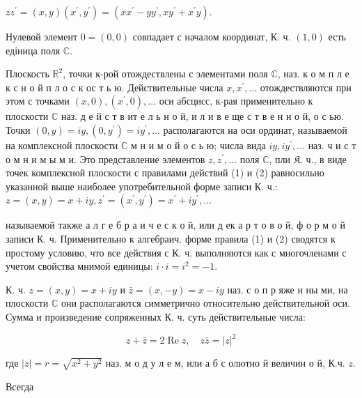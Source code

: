 \documentclass[10pt]{article}
\begin{document}
$z z^{\prime}=(x, y)\left(x^{\prime}, y^{\prime}\right)=\left(x x^{\prime}-y y^{\prime}, x y^{\prime}+x^{\prime} y\right)$.



Нулевой элемент $0=(0,0)$ совпадает с началом координат, К. ч. $(1,0)$ есть едіница поля $\mathbb{C}$.



Плоскость $\mathbb{R}^{2}$, точки к-рой отождествлены с элементами поля $\mathbb{C}$, наз. к о м п л е к с н о й п л о с к ос т ь ю. Действительные числа $x, x^{\prime}, \ldots$ отождествляются при этом с точками $(x, 0),\left(x^{\prime}, 0\right), \ldots$ оси абсцисс, к-рая применительно к плоскости $\mathbb{C}$ наз. д е й с т в ит е л ь н о й, и л и в е ще с т в е н н о й, о с ью. Точки $(0, y)=i y,\left(0, y^{\prime}\right)=i y^{\prime}, \ldots$ располагаются на оси ординат, называемой на комплексной плоскости $\mathbb{C}$ м н и м о й о с ь ю; числа вида $i y, i y^{\prime}, \ldots$ наз. ч и с т о м н и м ы м и. Это представление элементов $z, z^{\prime}, \ldots$ поля $\mathbb{C}$, пли $\mathfrak{K}$. ч., в виде точек комплексной плоскости с правилами действий (1) и (2) равносильно указанной выше наиболее употребительной форме записи К. ч.: $z=(x, y)=x+i y, z^{\prime}=\left(x^{\prime}, y^{\prime}\right)=x^{\prime}+i y^{\prime}, \ldots$



называемой также а л г е б р а и ч е с к о й, или д ек а р т о в о й, ф о р м о й записи К. ч. Применительно к алгебраич. форме правила (1) и (2) сводятся к простому условию, что все действия с $К$. ч. выполняются как с многочленами с учетом свойства мнимой единицы: $i \cdot i=i^{2}=-1$.



К. ч. $z=(x, y)=x+i y$ и $\bar{z}=(x,-y)=x-i y$ наз. с о п р яже н ны ми, на плоскости $\mathbb{C}$ они располагаются симметрично относительно действительной оси. Сумма и произведение сопряженных К. ч. суть действительные числа:



\[

z+\bar{z}=2 \operatorname{Re} z, \quad z \bar{z}=|z|^{2}

\]



где $|z|=r=\sqrt{x^{2}+y^{2}}$ наз. м о д у л е м, или а б с олютно й величин о й, К.ч. $z$.



Всегда
\end{document}
